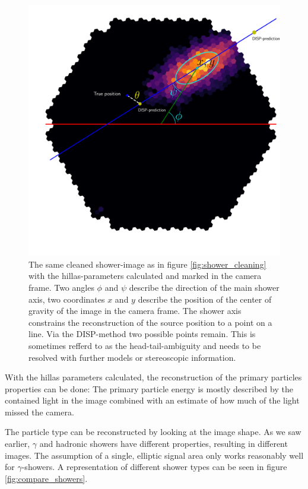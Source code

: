 \begin{figure}
	\centering
	\includegraphics[width=.8\textwidth]{Plots/hillas_complete.pdf}
	\caption{The same cleaned shower-image as in figure \ref{fig:shower_cleaning}
	with the hillas-parameters calculated and marked in the camera frame.
	Two angles $\phi$ and $\psi$ describe the direction of the 
	main shower axis, two coordinates $x$ and $y$ describe the position of 
	the center of gravity of the image in the camera frame.
	The shower axis constrains the reconstruction of the source position to a 
	point on a line. Via the DISP-method two possible points remain.
	This is sometimes refferd to as the head-tail-ambiguity and needs to be resolved
	with further models or stereoscopic information. 
	}
	\label{fig:hillas_params}
\end{figure}

With the hillas parameters calculated, the reconstruction of the 
primary particles properties can be done:
The primary particle energy is mostly described by the contained light in the image combined with 
an estimate of how much of the light missed the camera. 

The particle type can be reconstructed 
by looking at the image shape.
As we saw earlier, $\gamma$ and hadronic showers have different properties, 
resulting in different images. The assumption of a single, elliptic signal
area only works reasonably well for $\gamma$-showers.
A representation of different shower types can be seen in figure \ref{fig:compare_showers}.


